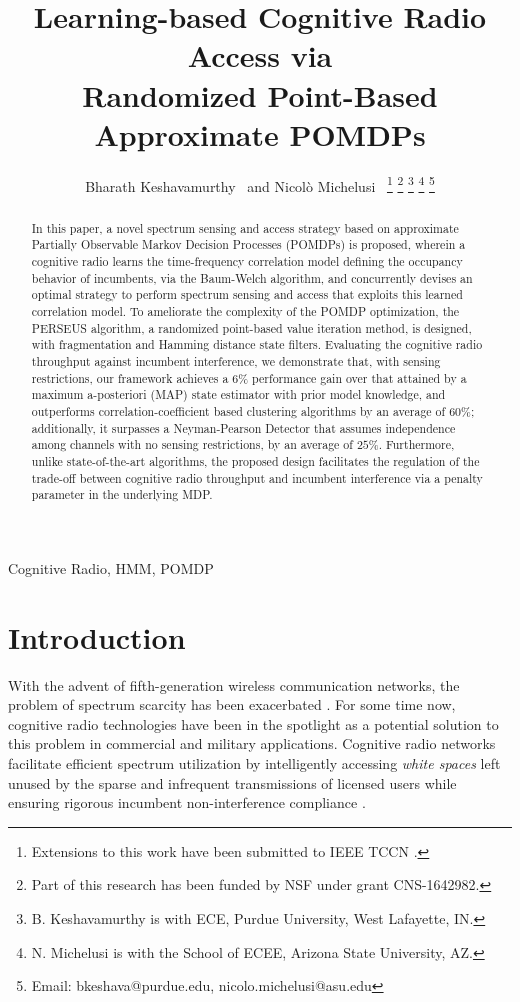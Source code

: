 \documentclass[10pt,twocolumn]{IEEEtran}
\title{Learning-based Cognitive Radio Access via
\\
Randomized Point-Based Approximate POMDPs}
\author{Bharath Keshavamurthy~\IEEEmembership{Student Member, ~IEEE} and Nicol\`{o} Michelusi~\IEEEmembership{Senior Member, ~IEEE}
\thanks{Extensions to this work have been submitted to IEEE TCCN \cite{TCCN:paper}.}
\thanks{Part of this research has been funded by NSF under grant CNS-1642982.}
\thanks{B. Keshavamurthy is with ECE, Purdue University, West Lafayette, IN.}
\thanks{N. Michelusi is with the School of ECEE, Arizona State University, AZ.}
\thanks{Email: bkeshava@purdue.edu, nicolo.michelusi@asu.edu}
\vspace{-12mm}}
\begin{document}
\maketitle
\thispagestyle{empty}
\pagestyle{empty} 
\begin{abstract}
In this paper, a novel spectrum sensing and access strategy based on approximate Partially Observable Markov Decision Processes (POMDPs) is proposed, wherein a cognitive radio learns the time-frequency correlation model defining the occupancy behavior of incumbents, via the Baum-Welch algorithm, and concurrently devises an optimal strategy to perform spectrum sensing and access that exploits this learned correlation model. To ameliorate the complexity of the POMDP optimization, the PERSEUS algorithm, a randomized point-based value iteration method, is designed, with fragmentation and Hamming distance state filters. Evaluating the cognitive radio throughput against incumbent interference, we demonstrate that, with sensing restrictions, our framework achieves a $6$\% performance gain over that attained by a maximum a-posteriori (MAP) state estimator with prior model knowledge, and outperforms correlation-coefficient based clustering algorithms by an average of $60$\%; additionally, it surpasses a Neyman-Pearson Detector that assumes independence among channels with no sensing restrictions, by an average of $25$\%. Furthermore,
 unlike state-of-the-art algorithms,  the proposed design facilitates the regulation of the trade-off between cognitive radio throughput and incumbent interference
 via a penalty parameter in the underlying MDP.
\end{abstract}
\vspace{-3mm}
\begin{IEEEkeywords}
Cognitive Radio, HMM, POMDP
\end{IEEEkeywords}
\vspace{-5.5mm}
\section{Introduction}\label{I}
With the advent of fifth-generation wireless communication networks, the problem of spectrum scarcity has been exacerbated \cite{7158089}. For some time now, cognitive radio technologies have been in the spotlight as a potential solution to this problem in commercial and military applications. Cognitive radio networks facilitate efficient spectrum utilization by intelligently accessing \emph{white spaces} left unused by the sparse and infrequent transmissions of licensed users while ensuring rigorous incumbent non-interference compliance \cite{4562537}.
\end{document}
